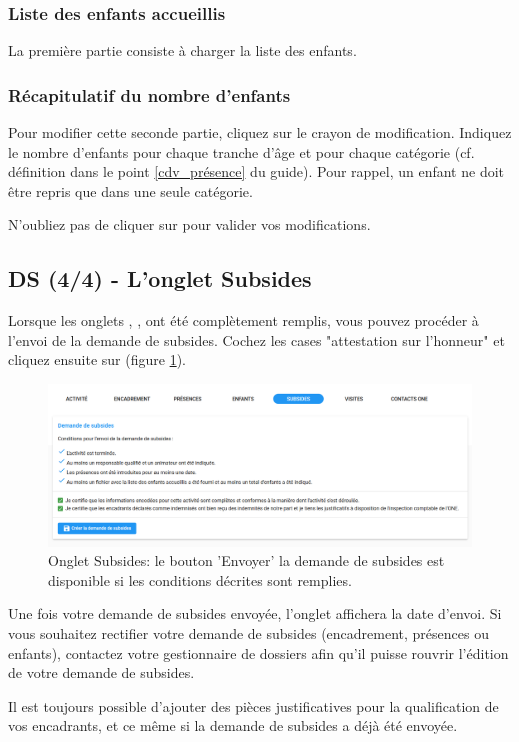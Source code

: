 \subsubsection{Liste des enfants accueillis}
La première partie consiste à charger la liste des enfants. 


\subsubsection{Récapitulatif du nombre d'enfants}
Pour modifier cette seconde partie, cliquez sur le crayon de modification. Indiquez le nombre d'enfants pour chaque tranche d'âge et pour chaque catégorie (cf. définition dans le point \ref{cdv_présence} du guide). Pour rappel, un enfant ne doit être repris que dans une seule catégorie.

N'oubliez pas de cliquer sur  pour valider vos modifications. 


\subsection{DS (4/4) - L'onglet Subsides}
Lorsque les onglets , ,  ont été complètement remplis, vous pouvez procéder à l'envoi de la demande de subsides. Cochez les cases "attestation sur l'honneur" et cliquez ensuite sur  (figure \ref{fig:cdv_subsides}). 

\begin{figure}[h]
    \centering
    \includegraphics[width=12.5cm]{Images/cdv/cdv-ds-subsides.png}
    \caption{Onglet Subsides: le bouton 'Envoyer' la demande de subsides est disponible si les conditions décrites sont remplies.}
    \label{fig:cdv_subsides}
\end{figure}


Une fois votre demande de subsides envoyée, l'onglet  affichera la date d'envoi. Si vous souhaitez rectifier votre demande de subsides (encadrement, présences ou enfants), contactez votre gestionnaire de dossiers afin qu'il puisse rouvrir l'édition de votre demande de subsides. 
\begin{information}
Il est toujours possible d'ajouter des pièces justificatives pour la qualification de vos encadrants, et ce même si la demande de subsides a déjà été envoyée.
\end{information}



